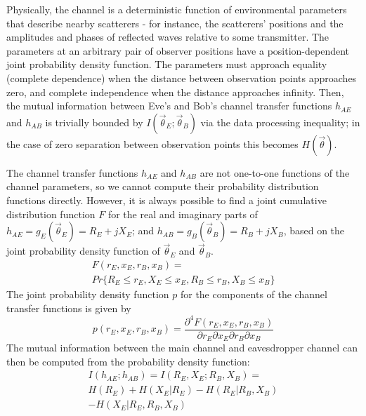 \documentclass[journal]{ieeetran}
\begin{document}
Physically, the channel is a deterministic function of environmental parameters that describe nearby scatterers - for instance, the scatterers' positions and the amplitudes and phases of reflected waves relative to some transmitter.  The parameters at an arbitrary pair of observer positions have a position-dependent joint probability density function.  The parameters must approach equality (complete dependence) when the distance between observation points approaches zero, and complete independence when the distance approaches infinity.
Then, the mutual information between Eve's and Bob's channel transfer functions $h_{AE}$ and $h_{AB}$ is trivially bounded by $I(\vec{\theta}_E;\vec{\theta}_B)$ via the data processing inequality; in the case of zero separation between observation points this becomes $H(\vec{\theta})$.

The channel transfer functions $h_{AE}$ and $h_{AB}$ are not one-to-one functions of the channel parameters, so we cannot compute their probability distribution functions directly.  However, it is always possible to find a joint cumulative distribution function $F$ for the real and imaginary parts of $h_{AE} = g_E(\vec{\theta}_E)=R_E+jX_E$; and $h_{AB}=g_B(\vec{\theta}_B)=R_B+jX_B$, based on the joint probability density function of $\vec{\theta}_E$ and $\vec{\theta}_B$.  
\begin{multline}
F(r_E,x_E,r_B,x_B) = \\Pr\{R_E \leq r_E, X_E \leq x_E, R_B \leq r_B, X_B \leq x_B \}
\end{multline}
The joint probability density function $p$ for the components of the channel transfer functions is given by
\begin{equation}
p(r_E,x_E,r_B, x_B) = \frac{\partial^4 F(r_E,x_E,r_B, x_B)}{\partial r_E \partial x_E \partial r_B \partial x_B}
\end{equation}
The mutual information between the main channel and eavesdropper channel can then be computed from the probability density function:
\begin{multline}
I(h_{AE}; h_{AB}) = I(R_E, X_E; R_B, X_B) = \\
 H(R_E)+H(X_E|R_E) -H(R_E|R_B,X_B) \\- H(X_E|R_E,R_B,X_B)
\end{multline}
\end{document}
